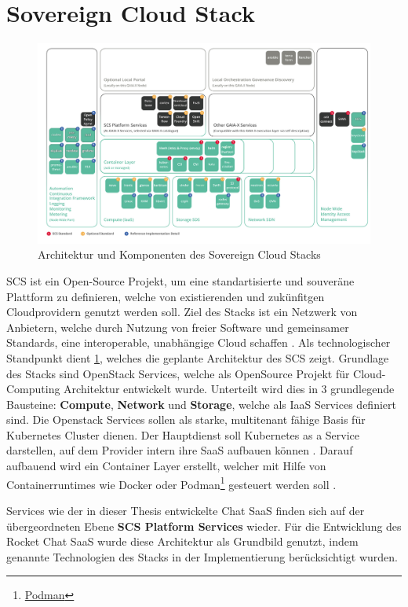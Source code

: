 \section{Sovereign Cloud Stack}
\label{sec:gaia-x-einbettung:scs}

\begin{figure}[h]
  \centering
  \includegraphics[height=0.71\textwidth]{gfx/chapters/4_gaia-X/scs_architecture.png}
  \caption{Architektur und Komponenten des Sovereign Cloud Stacks}
  \label{fig:scs_architecture}
\end{figure}

\ac{SCS} ist ein Open-Source Projekt, um eine standartisierte und souveräne Plattform zu definieren, welche von 
existierenden und zukünfitgen Cloudprovidern genutzt werden soll. 
Ziel des Stacks ist ein Netzwerk von Anbietern, welche durch Nutzung von freier Software und gemeinsamer Standards,
eine interoperable, unabhängige Cloud schaffen \cite{Kagermann2021}.
Als technologischer Standpunkt dient \ref{fig:scs_architecture}, welches die geplante Architektur des \ac{SCS} zeigt. 
Grundlage des Stacks sind OpenStack Services, welche als OpenSource Projekt für Cloud-Computing Architektur entwickelt wurde.
Unterteilt wird dies in 3 grundlegende Bausteine: \textbf{Compute}, \textbf{Network} und \textbf{Storage},
welche als \ac{IaaS} Services definiert sind.
Die Openstack Services sollen als starke, multitenant fähige Basis für Kubernetes Cluster dienen. 
Der Hauptdienst soll Kubernetes as a Service darstellen, auf dem Provider intern ihre \ac{SaaS} aufbauen können \cite{scs}.
Darauf aufbauend wird ein Container Layer erstellt, welcher mit Hilfe von Containerruntimes
wie Docker oder Podman\footnote{\href{https://podman.io}{Podman}} gesteuert werden soll \cite{scs}.

Services wie der in dieser Thesis entwickelte Chat \ac{SaaS} finden sich auf der übergeordneten Ebene \textbf{SCS Platform Services} wieder.
Für die Entwicklung des Rocket Chat \ac{SaaS} wurde diese Architektur als Grundbild genutzt, indem 
genannte Technologien des Stacks in der Implementierung berücksichtigt wurden.